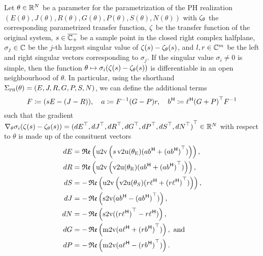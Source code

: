 \begin{theorem}\label{lem:inner-sobmor-gradient}
    Let $\theta \in \mathbb{R}^{N}$ be a parameter for the parametrization of the \ac{PH} realization $(E(\theta), J(\theta), R(\theta), G(\theta), P(\theta), S(\theta), N(\theta))$ with $\zeta_\theta$ the corresponding parametrized transfer function, $\zeta$ be the transfer function of the original system, $s \in \overline{\mathbb{C}_+}$ be a sample point in the closed right complex halfplane, $\sigma_j \in \mathbb{C}$ be the $j$-th largest singular value of $\zeta(s) - \zeta_\theta(s)$, and $l, r \in \mathbb{C}^m$ be the left and right singular vectors corresponding to $\sigma_j$.
    If the singular value $\sigma_i \neq 0$ is simple, then the function $\theta \mapsto \sigma_i(\zeta(s) - \zeta_\theta(s))$ is differentiable in an open neighbourhood of $\theta$.
    In particular, using the shorthand $\Sigma_{\textnormal{\scshape ph}}(\theta) = (E, J, R, G, P, S, N)$, we can define the additional terms
    \begin{equation}\label{eq:inner-sobmor-gradient-helpers}
        F \coloneqq (s E - (J - R)),\quad a \coloneqq F\inv (G - P) r,\quad b\herm \coloneqq \ell\herm {(G + P)}\trans F\inv
    \end{equation}
    such that the gradient $\nabla_\theta \sigma_i(\zeta(s) - \zeta_\theta(s)) = {({dE}^{\top}, {dJ}^{\top}, {dR}^{\top}, {dG}^{\top}, {dP}^{\top}, {dS}^{\top}, {dN}^{\top})}^{\top} \in \mathbb{R}^N$ with respect to $\theta$ is made up of the consituent vectors
    \begin{equation}\label{eq:inner-sobmor-gradient-components}
        \begin{aligned}
            dE &= \re{\uppervec\left( s \vecupper(\theta_\msc{E}) (a b\herm + {(a b\herm)}\trans) \right)}, \\
            dR &= \re{\uppervec\left( \vecupper(\theta_\msc{R}) (a b\herm + {(a b\herm)}\trans) \right)}, \\
            dS &= - \re{\uppervec\left( \vecupper(\theta_S) (r \ell\herm + {(r \ell\herm)}\trans) \right)}, \\
            dJ &= - \re{\strictvec(a b\herm - {(a b\herm)}\trans)}, \\
            dN &= - \re{\strictvec({(r \ell\herm)}\trans - r \ell\herm)}, \\
            dG &= - \re{\matvec(a \ell\herm + {(r b\herm)}\trans)}, \text{ and} \\
            dP &= - \re{\matvec(a \ell\herm - {(r b\herm)}\trans)}.
        \end{aligned}
    \end{equation}
\end{theorem}

